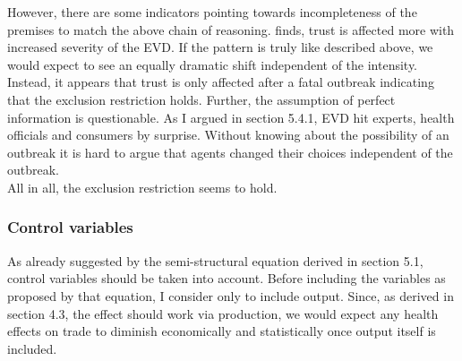 \documentclass{article}
\begin{document}
However, there are some indicators pointing towards incompleteness of the premises to match the above chain of reasoning. \cite{gonzalez2017epidemics} finds, trust is affected more with increased severity of the EVD. If the pattern is truly like described above, we would expect to see an equally dramatic shift independent of the intensity. Instead, it appears that trust is only affected after a fatal outbreak indicating that the exclusion restriction holds. Further, the assumption of perfect information is questionable. As I argued in section 5.4.1, EVD hit experts, health officials and consumers by surprise. Without knowing about the possibility of an outbreak it is hard to argue that agents changed their choices independent of the outbreak.\\
All in all, the exclusion restriction seems to hold.

\subsubsection{Control variables}

As already suggested by the semi-structural equation derived in section 5.1, control variables should be taken into account. Before including the variables as proposed by that equation, I consider only to include output. Since, as derived in section 4.3, the effect should work via production, we would expect any health effects on trade to diminish economically and statistically once output itself is included. \\ 
\end{document}
